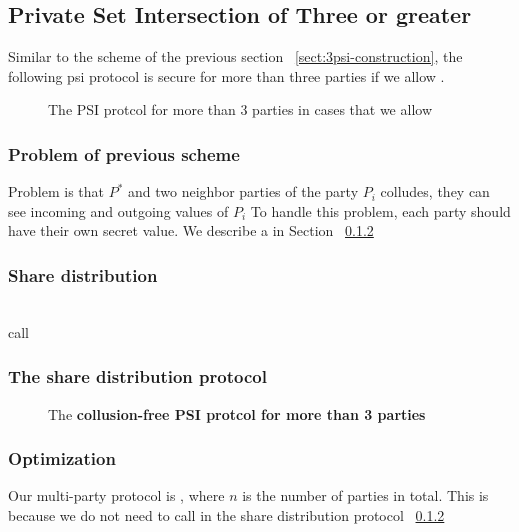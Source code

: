 \subsection{Private Set Intersection of Three or greater}
\label{sect:npsi-construction}

Similar to the scheme of the previous section ~\ref{sect:3psi-construction}, the following psi protocol is secure for more than three parties if we allow . 

\begin{figure}[h]\centering
{}
\caption{The PSI protcol for more than 3 parties in cases that we allow }
\label{fig:npsicollud}
\end{figure}

\subsubsection{Problem of previous scheme}
Problem is that $P^*$ and two neighbor parties of the party $P_i$ colludes, they can see incoming and outgoing values of $P_i$  To handle this problem, each party should have their own secret value. We describe a  in Section ~\ref{sect:share}

\subsubsection{Share distribution}
\label{sect:share}

		 \\
		 call \todo{\SSOT} \\

\subsubsection{The share distribution protocol}
\begin{figure}[h]\centering
{}
\caption{The \bf{collusion-free} PSI protcol for more than 3 parties}
\label{fig:npsicollud}
\end{figure}

\subsubsection{Optimization}
Our multi-party protocol is , where $n$ is the number of parties in total. This is because we do not need to call \SSOT in the share distribution protocol  ~\ref{sect:share}